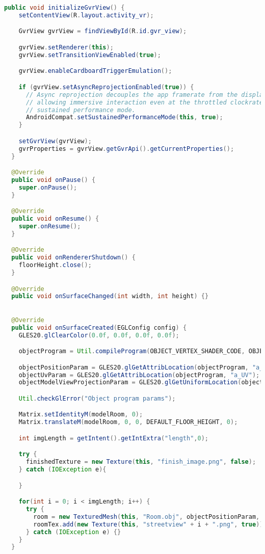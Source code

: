 \begin{lstlisting}[language=Java,caption=VrActivity.java]
  public void initializeGvrView() {
    setContentView(R.layout.activity_vr);

    GvrView gvrView = findViewById(R.id.gvr_view);

    gvrView.setRenderer(this);
    gvrView.setTransitionViewEnabled(true);

    gvrView.enableCardboardTriggerEmulation();

    if (gvrView.setAsyncReprojectionEnabled(true)) {
      // Async reprojection decouples the app framerate from the display framerate,
      // allowing immersive interaction even at the throttled clockrates set by
      // sustained performance mode.
      AndroidCompat.setSustainedPerformanceMode(this, true);
    }

    setGvrView(gvrView);
    gvrProperties = gvrView.getGvrApi().getCurrentProperties();
  }

  @Override
  public void onPause() {
    super.onPause();
  }

  @Override
  public void onResume() {
    super.onResume();
  }

  @Override
  public void onRendererShutdown() {
    floorHeight.close();
  }

  @Override
  public void onSurfaceChanged(int width, int height) {}

  
  @Override
  public void onSurfaceCreated(EGLConfig config) {
    GLES20.glClearColor(0.0f, 0.0f, 0.0f, 0.0f);

    objectProgram = Util.compileProgram(OBJECT_VERTEX_SHADER_CODE, OBJECT_FRAGMENT_SHADER_CODE);

    objectPositionParam = GLES20.glGetAttribLocation(objectProgram, "a_Position");
    objectUvParam = GLES20.glGetAttribLocation(objectProgram, "a_UV");
    objectModelViewProjectionParam = GLES20.glGetUniformLocation(objectProgram, "u_MVP");

    Util.checkGlError("Object program params");

    Matrix.setIdentityM(modelRoom, 0);
    Matrix.translateM(modelRoom, 0, 0, DEFAULT_FLOOR_HEIGHT, 0);

    int imgLength = getIntent().getIntExtra("length",0);

    try {
      finishedTexture = new Texture(this, "finish_image.png", false);
    } catch (IOException e){

    }

    for(int i = 0; i < imgLength; i++) {
      try {
        room = new TexturedMesh(this, "Room.obj", objectPositionParam, objectUvParam);
        roomTex.add(new Texture(this, "streetview" + i + ".png", true));
      } catch (IOException e) {}
    }
  }
  

\end{lstlisting}
